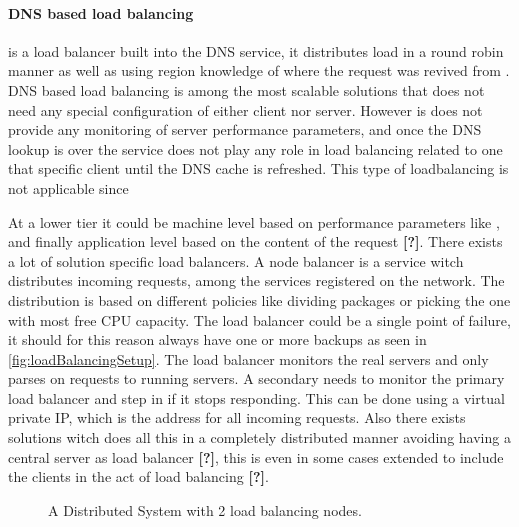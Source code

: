 \paragraph{DNS based load balancing} %
is a load balancer built into the DNS service, it distributes load in a round robin manner as well as using region knowledge of where the request was revived from \cite{Amazon:Route53}. DNS based load balancing is among the most scalable solutions that does not need any special configuration of either client nor server. However is does not provide any monitoring of server performance parameters, and once the DNS lookup is over the service does not play any role in load balancing related to one that specific client until the DNS cache is refreshed. This type of loadbalancing is not applicable since 

At a lower tier it could be machine level based on performance parameters like \cite{zhang2000linuxVirtualServer}, and finally application level based on the content of the request \textbf{[?]}. %
There exists a lot of solution specific load balancers.
A node balancer is a service witch distributes incoming requests, among the services registered on the network.
The distribution is based on different policies like dividing packages or picking the one with most free CPU capacity.
The load balancer could be a single point of failure, it should for this reason always have one or more backups as seen in \cref{fig:loadBalancingSetup}.
The load balancer monitors the real servers and only parses on requests to running servers.
A secondary needs to monitor the primary load balancer and step in if it stops responding.
This can be done using a virtual private IP, which is the address for all incoming requests. Also there exists solutions witch does all this in a completely distributed manner avoiding having a central server as load balancer  \textbf{[?]}, %
this is even in some cases extended to include the clients in the act of load balancing \textbf{[?]}. %

\begin{figure}
	\centering	
	\scalebox{0.7}{}
	\caption[Distributed System with 2 load balancing nodes]{
		\label{fig:loadBalancingSetup2Balancers} 
		\footnotesize{%
			A Distributed System with 2 load balancing nodes.
		}
	}
\end{figure}

